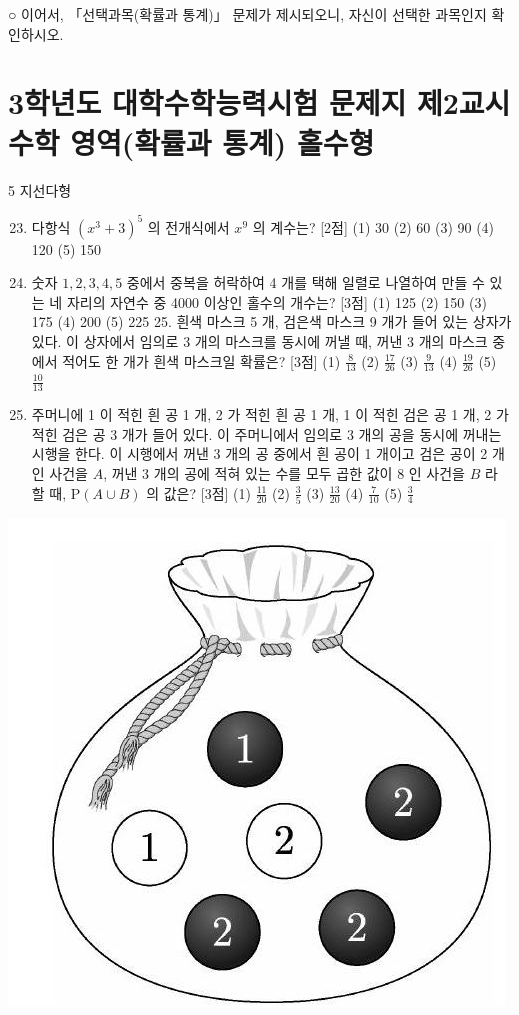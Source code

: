 \documentclass[10pt]{article}
\begin{document}
○ 이어서, 「선택과목(확률과 통계)」 문제가 제시되오니, 자신이 선택한 과목인지 확인하시오.

\section{3학년도 대학수학능력시험 문제지
제2교시 수학 영역(확률과 통계)
홀수형}
5 지선다형

\begin{enumerate}
  \setcounter{enumi}{22}
  \item 다항식 $\left(x^{3}+3\right)^{5}$ 의 전개식에서 $x^{9}$ 의 계수는? [2점]
(1) 30
(2) 60
(3) 90
(4) 120
(5) 150

  \item 숫자 $1,2,3,4,5$ 중에서 중복을 허락하여 4 개를 택해 일렬로 나열하여 만들 수 있는 네 자리의 자연수 중 4000 이상인 홀수의 개수는? [3점]
(1) 125
(2) 150
(3) 175
(4) 200
(5) 225 25. 흰색 마스크 5 개, 검은색 마스크 9 개가 들어 있는 상자가 있다. 이 상자에서 임의로 3 개의 마스크를 동시에 꺼낼 때, 꺼낸 3 개의 마스크 중에서 적어도 한 개가 흰색 마스크일 확률은? [3점]
(1) $\frac{8}{13}$
(2) $\frac{17}{26}$
(3) $\frac{9}{13}$
(4) $\frac{19}{26}$
(5) $\frac{10}{13}$

  \item 주머니에 1 이 적힌 흰 공 1 개, 2 가 적힌 흰 공 1 개, 1 이 적힌 검은 공 1 개, 2 가 적힌 검은 공 3 개가 들어 있다. 이 주머니에서 임의로 3 개의 공을 동시에 꺼내는 시행을 한다. 이 시행에서 꺼낸 3 개의 공 중에서 흰 공이 1 개이고 검은 공이 2 개인 사건을 $A$, 꺼낸 3 개의 공에 적혀 있는 수를 모두 곱한 값이 8 인 사건을 $B$ 라 할 때, $\mathrm{P}(A \cup B)$ 의 값은? [3점]
(1) $\frac{11}{20}$
(2) $\frac{3}{5}$
(3) $\frac{13}{20}$
(4) $\frac{7}{10}$
(5) $\frac{3}{4}$

\end{enumerate}

\begin{center}
\includegraphics[max width=\textwidth]{2023_06_06_b380aa8523ec7afae994g-10}
\end{center}
\end{document}
